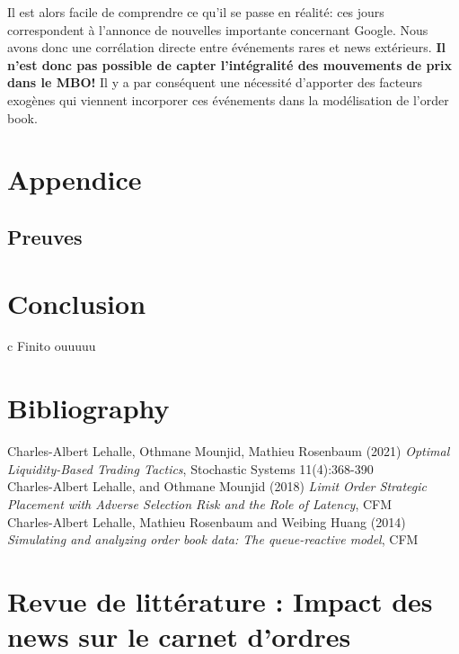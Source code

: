 \documentclass[12pt,a4paper]{article}
\theoremstyle{definition}
\theoremstyle{remark}
\begin{document}
Il est alors facile de comprendre ce qu'il se passe en réalité: ces jours correspondent à l'annonce de nouvelles importante concernant Google. Nous avons donc une corrélation directe entre événements rares et news extérieurs. \textbf{Il n'est donc pas possible de capter l'intégralité des mouvements de prix dans le MBO!} Il y a par conséquent une nécessité d'apporter des facteurs exogènes qui viennent incorporer ces événements dans la modélisation de l'order book.




    
    
    \newpage
    \vspace*{5cm}
    \section*{Appendice}
    \vspace*{2cm}
    \subsection*{Preuves}


    \newpage
    \vspace*{5cm}
    \section*{Conclusion}
    \vspace*{2cm}
    c Finito ouuuuu
    \newpage
    \vspace*{5cm}
    \section*{Bibliography}

    Charles-Albert Lehalle, Othmane Mounjid, Mathieu Rosenbaum (2021) \textit{Optimal Liquidity-Based Trading Tactics}, Stochastic Systems 11(4):368-390 
    \\
    Charles-Albert Lehalle, and Othmane Mounjid (2018) \textit{Limit Order Strategic Placement
    with Adverse Selection Risk
    and the Role of Latency}, CFM
    \\
    Charles-Albert Lehalle, Mathieu Rosenbaum and Weibing Huang (2014) \textit{Simulating and analyzing order book data: The queue-reactive model}, CFM

    \section{Revue de littérature : Impact des news sur le carnet d'ordres}
\end{document}
